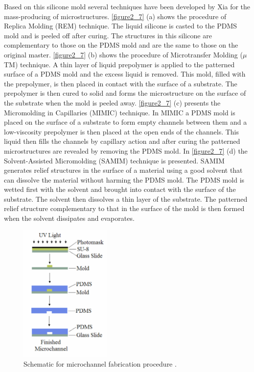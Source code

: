 Based on this silicone mold several techniques have been developed by Xia for the mass-producing of microstructures. \autoref{figure2_7} (a) shows the procedure of Replica Molding (REM) technique. The liquid silicone is casted to the PDMS mold and is peeled off after curing. The structures in this silicone are complementary to those on the PDMS mold and are the same to those on the original master. \autoref{figure2_7} (b) shows the procedure of Microtransfer Molding ($\mu$TM) technique. A thin layer of liquid prepolymer is applied to the patterned surface of a PDMS mold and the excess liquid is removed. This mold, filled with the prepolymer, is then placed in contact with the surface of a substrate. The prepolymer is then cured to solid and forms the microstructure on the surface of the substrate when the mold is peeled away. \autoref{figure2_7} (c) presents the Micromolding in Capillaries (MIMIC) technique. In MIMIC a PDMS mold is placed on the surface of a substrate to form empty channels between them and a low-viscosity prepolymer is then placed at the open ends of the channels. This liquid then fills the channels by capillary action and after curing the patterned microstructures are revealed by removing the PDMS mold. In \autoref{figure2_7} (d) the Solvent-Assisted Micromolding (SAMIM) technique is presented. SAMIM generates relief structures in the surface of a material using a good solvent that can dissolve the material without harming the PDMS mold. The PDMS mold is wetted first with the solvent and brought into contact with the surface of the substrate. The solvent then dissolves a thin layer of the substrate. The patterned relief structure complementary to that in the surface of the mold is then formed when the solvent dissipates and evaporates.

\begin{figure}[h]%
\centering
\includegraphics[width=0.4\textwidth]{figures/literaturereview/figure2_8}%
\caption{Schematic for microchannel fabrication procedure \cite{boyajian2010microchannel}.}%
\label{figure2_8}%
\end{figure}

